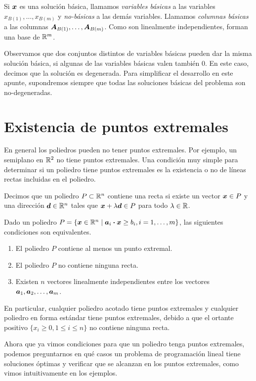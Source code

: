 Si $\bm{x}$ es una solución básica, llamamos \emph{variables básicas} a las variables $x_{B(1)}, \dots, x_{B(m)}$ y \emph{no-básicas} a las demás variables. Llamamos \emph{columnas básicas} a las columnas $\bm{A}_{B(1)}, \dots, \bm{A}_{B(m)}$. Como son linealmente independientes, forman una base de $\mathbb{R}^m$.

Observamos que dos conjuntos distintos de variables básicas pueden dar la misma solución básica, si algunas de las variables básicas valen también $0$. En este caso, decimos que la solución es degenerada. Para simplificar el desarrollo en este apunte, supondremos siempre que todas las soluciones básicas del problema son no-degeneradas.

\section{Existencia de puntos extremales}

En general los poliedros pueden no tener puntos extremales. Por ejemplo, un semiplano en $\mathbb{R}^2$ no tiene puntos extremales.
Una condición muy simple para determinar si un poliedro tiene puntos extremales es la existencia o no de líneas rectas incluidas en el poliedro.

Decimos que un poliedro $P \subset \mathbb{R}^n$ contiene una recta si existe un vector $\bm{x} \in P$ y una dirección $\bm{d} \in \mathbb{R}^n$ tales que $\bm{x} + \lambda \bm{d} \in P$ para todo $\lambda \in \mathbb{R}$.

\begin{theorem}
Dado un poliedro $P = \{\bm{x} \in \mathbb{R}^n \mid \bm{a}_i \boldsymbol{\cdot} \bm{x} \ge b_i, i = 1, \dots, m\}$, las siguientes condiciones son equivalentes.

\begin{enumerate}
\item El poliedro $P$ contiene al menos un punto extremal.
\item El poliedro $P$ no contiene ninguna recta.
\item Existen $n$ vectores linealmente independientes entre los vectores $\bm{a}_1, \bm{a}_2, \dots, \bm{a}_m$.
\end{enumerate}
\end{theorem}

En particular, cualquier poliedro acotado tiene puntos extremales y cualquier poliedro en forma estándar tiene puntos extremales, debido a que el ortante positivo $\{x_i \ge 0, 1 \le i \le n\}$ no contiene ninguna recta.

Ahora que ya vimos condiciones para que un poliedro tenga puntos extremales, podemos preguntarnos en qué casos un problema de programación lineal tiene soluciones óptimas y verificar que se alcanzan en los puntos extremales, como vimos intuitivamente en los ejemplos.

